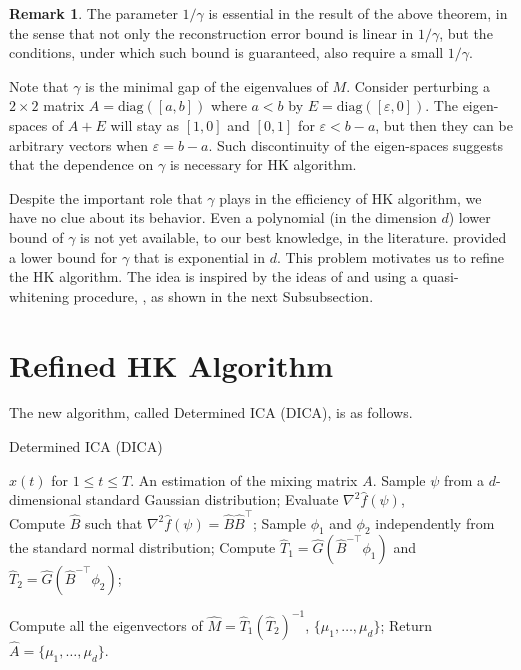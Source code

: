 \documentclass[twoside]{article}
\theoremstyle{definition}
\newtheorem{remark}[lemma]{Remark}
\newcommand{\eps}{\varepsilon}
\begin{document}
\begin{remark}
The parameter $1/\gamma$ is essential in the result of the above theorem, in the sense that not only the reconstruction error bound is linear in $1/\gamma$, but the conditions, under which such bound is guaranteed, also require a small $1/\gamma$.

Note that $\gamma$ is the minimal gap of the eigenvalues of $M$.
Consider perturbing a $2\times 2$ matrix $A = \text{diag}([a,b])$ where $a<b$ by $E = \text{diag}([\eps,0])$. 
The eigen-spaces of $A+E$ will stay as $[1,0]$ and $[0,1]$ for $\eps < b-a$, but then they can be arbitrary vectors when $\eps = b-a$.  
Such discontinuity of the eigen-spaces suggests that the dependence on $\gamma$ is necessary for HK algorithm. 

Despite the important role that $\gamma$ plays in the efficiency of HK algorithm, we have no clue about its behavior. 
Even a polynomial (in the dimension $d$) lower bound of $\gamma$ is not yet available, to our best knowledge, in the literature. 
\citet{goyal2014fourier} provided a lower bound for $\gamma$ that is exponential in $d$.
This problem motivates us to refine the HK algorithm.
The idea is inspired by the ideas of \citep{arora2012provable} and \citep{frieze1996learning} using a quasi-whitening procedure, , as shown in the next Subsubsection.
\end{remark}


\section{Refined HK Algorithm}
\label{sec:DICA}
The new algorithm, called Determined ICA (DICA), is as follows. 
\begin{algorithm}[H]
\caption{Determined ICA (DICA)}
\begin{algorithmic}[1]
\INPUT $x(t)$ for $1\le t \le T$. 
\OUTPUT An estimation of the mixing matrix $A$. 
\STATE Sample $\psi$ from a $d$-dimensional standard Gaussian distribution;
\STATE Evaluate $\nabla^2\widehat{f}(\psi)$, \\
\STATE Compute $\widehat{B}$ such that $\nabla^2\widehat{f}(\psi) = \widehat{B}\widehat{B}^{\top}$;
\STATE Sample $\phi_1$ and $\phi_2$ independently from the standard normal distribution;
\STATE Compute $\widehat{T}_1 = \widehat{G}(\widehat{B}^{-\top}\phi_1)$ and  $\widehat{T}_2 =\widehat{G}(\widehat{B}^{-\top}\phi_2)$;

\STATE Compute all the eigenvectors of $\widehat{M} = \widehat{T}_1\left(\widehat{T}_2\right)^{-1}$, $\{\mu_1,\ldots,\mu_d\}$;
\STATE Return $\widehat{A} = \{\mu_1,\ldots,\mu_d\}$.
\end{algorithmic}
\end{algorithm}
\end{document}

